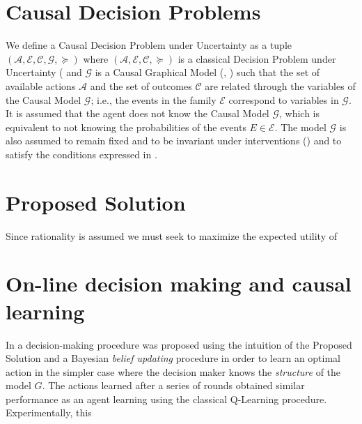 \documentclass[letterpaper]{article} %
\begin{document}
\section{Causal Decision Problems}
We define a Causal Decision Problem under Uncertainty as a tuple $(\mathcal{A}, \mathcal{E}, \mathcal{C}, \mathcal{G}, \succeq)$ where  $(\mathcal{A}, \mathcal{E}, \mathcal{C}, \succeq)$ is a classical Decision Problem under Uncertainty (\cite{bernardo2000bayesian} and $\mathcal{G}$ is a Causal Graphical Model (\cite{koller2009probabilistic}, \cite{sucar2015probabilistic}) such that the set of available actions $\mathcal{A}$ and the set of outcomes $\mathcal{C}$ are related through the variables of the Causal Model $\mathcal{G}$; i.e., the events in the family $\mathcal{E}$ correspond to variables in $\mathcal{G}$. It is assumed that the agent does not know the Causal Model $\mathcal{G}$, which is equivalent to not knowing the probabilities of the events $E \in \mathcal{E}$. The model $\mathcal{G}$ is also assumed to remain fixed and to be invariant under interventions (\cite{woodward2005making}) and to satisfy the conditions expressed in \cite{spirtes2000causation}.
\section{Proposed Solution}
Since rationality is assumed we must seek to maximize the expected utility of 

\section{On-line decision making and causal learning}
In \cite{gonzalez2018playing} a decision-making procedure was proposed using the intuition of the Proposed Solution and a Bayesian \textit{belief updating} procedure in order to learn an optimal action in the simpler case where the decision maker knows the \textit{structure} of the model $\textit{G}$. The actions learned after a series of rounds obtained similar performance as an agent learning using the classical Q-Learning procedure. Experimentally, this


\end{document}
